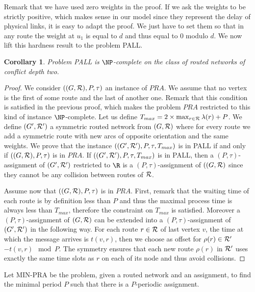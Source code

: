 \documentclass[10pt, conference, letterpaper]{IEEEtran}
\newtheorem{corollary}{Corollary}
\begin{document}
 Remark that we have used zero weights in the proof. If we ask the weights to be strictly positive, which makes sense in our model since they represent the delay of physical links, it is easy to adapt the proof. We just have to set them so that in any route the weight at $u_1$ is equal to $d$ and thus equal to $0$ modulo $d$. We now lift this hardness result to the problem PALL.

\begin{corollary}
Problem PALL is $\NP$-complete on the class of routed networks of conflict depth two.
\end{corollary}
\begin{proof}
 We consider $((G,{\cal R}),P,\tau)$ an instance of $PRA$. We assume that no vertex is the first of some route and the last of another one. Remark that this condition is satisfied in the previous proof, which makes the problem $PRA$ restricted to this kind of instance $\NP$-complete. 
 Let us define $T_{max} = 2 \times \max_{r \in {\cal R}} \lambda(r) + P$. We define $(G',{\cal R}')$ a symmetric routed network from $(G,{\cal R})$ where for every route we add a symmetric route with new arcs of opposite orientation and the same weights.
 We prove that the instance $((G',{\cal R'}),P,\tau,T_{max})$ is in PALL if and only if $((G,{\cal R}),P,\tau)$ is in $PRA$.
 If $((G',{\cal R'}),P,\tau,T_{max})$ is in PALL, then a $(P,\tau)$-assignment of $(G',{\cal R'})$ restricted to $\R$ is a $(P,\tau)$-assignment of $((G,{\cal R})$ since they cannot be any collision between routes of ${\cal R}$.
 
 Assume now that $((G,{\cal R}),P,\tau)$ is in $PRA$. First, remark that the waiting time of each route is by definition less than $P$ and thus the maximal process time is always less than $T_{max}$, therefore the constraint on $T_{max}$ is satisfied. Moreover a $(P,\tau)$-assignment of $(G,{\cal R})$ can be extended into a $(P,\tau)$-assignment of $(G',{\cal R'})$ in the following way. For each route $r \in \cal{R}$ of last vertex $v$, the time at which the message arrives is $t(v,r)$, then we choose as offset for $\rho(r) \in \cal{R}'$ $-t(v,r) \mod P$. The symmetry ensures that each new route $\rho(r)$ in ${\cal R'}$ uses exactly the same time slots as $r$ on each of its node and thus avoid collisions.
\end{proof}

Let MIN-PRA be the problem, given a routed network and an assignment, to find the minimal period $P$ such that there is a $P$-periodic assignment. 
\end{document}
